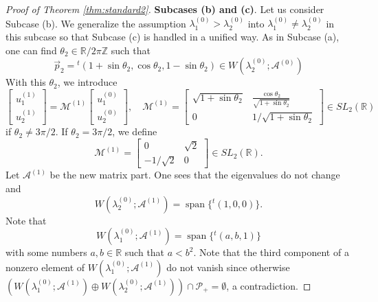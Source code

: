 \documentclass[11pt,a4paper,twosides]{amsart}
\theoremstyle{plain}
\theoremstyle{remark}
\numberwithin{equation}{section}
\newcommand{\R}{\mathbb{R}}
\newcommand{\Z}{\mathbb{Z}}
\DeclareMathOperator{\Span}{span}
\theoremstyle{definition}
\newcommand{\1}{{\bf 1}_{\{|x| < |t|\}}}
\begin{document}
\begin{proof}[Proof of Theorem \ref{thm:standard2}]
{\bf Subcases (b) and (c)}. 
Let us consider Subcase (b). 
We generalize the assumption $\lambda_1^{(0)}>\lambda_2^{(0)}$ into $\lambda_1^{(0)}\neq \lambda_2^{(0)}$ in this subcase
so that Subcase (c) is handled in a unified way.
As in Subcase (a), one can find $\theta_2 \in \R /2\pi \Z$ such that
\[
	\vec{p}_2 = {}^t\!(
	 1+ \sin \theta_2,
	  \cos \theta_2, 
	  1- \sin \theta_2 )\in W(\lambda_2^{(0)};\mathscr{A}^{(0)}) \]
With this $\theta_2$, we introduce
\[
	\begin{bmatrix}
	u_1^{(1)}\\
	u_2^{(1)}
	\end{bmatrix}
	=
	\mathscr{M}^{(1)}
	\begin{bmatrix}
	u_1^{(0)}\\
	u_2^{(0)}
	\end{bmatrix}, \quad
	\mathscr{M}^{(1)}=\begin{bmatrix}
	\sqrt{1+\sin \theta_2} &  \frac{\cos \theta_2}{\sqrt{1+\sin \theta_2}} \\
	0 & 1/\sqrt{1+\sin\theta_2}
	\end{bmatrix}\in SL_2(\R)
\]
if $\theta_2\neq3\pi/2$.
If $\theta_2=3\pi/2$, we define 
\[
	\mathscr{M}^{(1)}=\begin{bmatrix}
0 & \sqrt2 \\
	-1/\sqrt2 & 0
	\end{bmatrix}\in SL_2(\R).
\]
Let $\mathcal{A}^{(1)}$ be the new matrix part.
One sees that the eigenvalues do not change and
\[
	W(\lambda_2^{(0)};\mathcal{A}^{(1)})
	= \Span \{ {}^t\!(1,0,0) \}.
\]
Note that
\[
	W(\lambda_1^{(0)};\mathcal{A}^{(1)})
	= \Span \{ {}^t\!(a,b,1) \}
\]
with some numbers $a,b \in \R$ such that $a<b^2$.
Note that the third component of a nonzero element of $W(\lambda_1^{(0)};\mathcal{A}^{(1)})$ do not vanish since otherwise 
$(W(\lambda_1^{(0)};\mathcal{A}^{(1)}) \oplus W(\lambda_2^{(0)};\mathcal{A}^{(1)})) \cap \mathcal{P}_+ = \emptyset$, a contradiction.


\end{proof}
\end{document}
